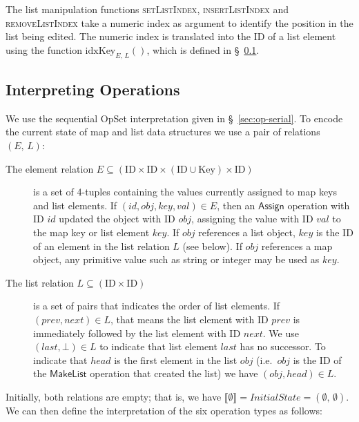 The list manipulation functions \textsc{setListIndex}, \textsc{insertListIndex} and \textsc{removeListIndex} take a numeric index as argument to identify the position in the list being edited.
The numeric index is translated into the ID of a list element using the function $\mathrm{idxKey}_{E,\, L}()$, which is defined in \S~\ref{sec:datatypes-interp}.

\subsection{Interpreting Operations}\label{sec:datatypes-interp}

We use the sequential OpSet interpretation given in \S~\ref{sec:op-serial}.
To encode the current state of map and list data structures we use a pair of relations $(E,\, L)$:
\begin{description}
    \item[The element relation $E \subseteq (\mathrm{ID} \times \mathrm{ID} \times (\mathrm{ID} \cup \mathrm{Key}) \times \mathrm{ID})$]
        is a set of 4-tuples containing the values currently assigned to map keys and list elements.
        If $(\mathit{id}, \mathit{obj}, \mathit{key}, \mathit{val}) \in E$, then an $\mathsf{Assign}$ operation with ID $\mathit{id}$ updated the object with ID $\mathit{obj}$, assigning the value with ID $\mathit{val}$ to the map key or list element $\mathit{key}$.
        If $\mathit{obj}$ references a list object, $\mathit{key}$ is the ID of an element in the list relation $L$ (see below).
        If $\mathit{obj}$ references a map object, any primitive value such as string or integer may be used as $\mathit{key}$.
    \item[The list relation $L \subseteq (\mathrm{ID} \times \mathrm{ID})$] is a set of pairs that indicates the order of list elements.
        If $(\mathit{prev}, \mathit{next}) \in L$, that means the list element with ID $\mathit{prev}$ is immediately followed by the list element with ID $\mathit{next}$.
        We use $(\mathit{last}, \bot) \in L$ to indicate that list element $\mathit{last}$ has no successor.
        To indicate that $\mathit{head}$ is the first element in the list $\mathit{obj}$ (i.e.\ $\mathit{obj}$ is the ID of the $\mathsf{MakeList}$ operation that created the list) we have $(\mathit{obj}, \mathit{head}) \in L$.
\end{description}
Initially, both relations are empty; that is, we have $\llbracket\emptyset\rrbracket = \mathit{InitialState} = (\emptyset,\, \emptyset)$.
We can then define the interpretation of the six operation types as follows:
